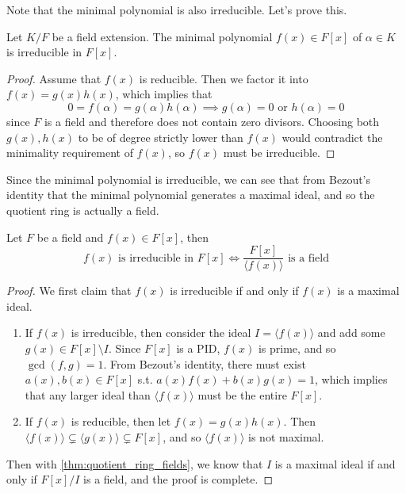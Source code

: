   Note that the minimal polynomial is also irreducible. Let's prove this. 

  \begin{lemma}
    Let $K/F$ be a field extension. The minimal polynomial $f(x) \in F[x]$ of $\alpha \in K$ is irreducible in $F[x]$. 
  \end{lemma}
  \begin{proof}
    Assume that $f(x)$ is reducible. Then we factor it into $f(x) = g(x) h(x)$, which implies that 
    \begin{equation}
      0 = f(\alpha) = g(\alpha) h(\alpha) \implies g(\alpha) = 0 \text{ or } h(\alpha) = 0
    \end{equation}
    since $F$ is a field and therefore does not contain zero divisors. Choosing both $g(x), h(x)$ to be of degree strictly lower than $f(x)$ would contradict the minimality requirement of $f(x)$, so $f(x)$ must be irreducible. 
  \end{proof}

  Since the minimal polynomial is irreducible, we can see that from Bezout's identity that the minimal polynomial generates a maximal ideal, and so the quotient ring is actually a field. 

  \begin{theorem}
    Let $F$ be a field and $f(x) \in F[x]$, then 
    \begin{equation}
      f(x) \text{ is irreducible in } F[x] \iff \frac{F[x]}{\langle f(x) \rangle} \text{ is a field}
    \end{equation} 
  \end{theorem}
  \begin{proof}
    We first claim that $f(x)$ is irreducible if and only if $f(x)$ is a maximal ideal.  
    \begin{enumerate}
      \item If $f(x)$ is irreducible, then consider the ideal $I = \langle f(x) \rangle$ and add some $g(x) \in F[x] \setminus I$. Since $F[x]$ is a PID, $f(x)$ is prime, and so $\gcd(f, g) = 1$. From Bezout's identity, there must exist $a(x), b(x) \in F[x]$ s.t. $a(x) f(x) + b(x) g(x) = 1$, which implies that any larger ideal than $\langle f(x) \rangle$ must be the entire $F[x]$. 

      \item If $f(x)$ is reducible, then let $f(x) = g(x) h(x)$. Then $\langle f(x) \rangle \subsetneq \langle g(x) \rangle \subsetneq F[x]$, and so $\langle f(x) \rangle$ is not maximal. 
    \end{enumerate}
    Then with \ref{thm:quotient_ring_fields}, we know that $I$ is a maximal ideal if and only if $F[x]/I$ is a field, and the proof is complete. 
  \end{proof}

